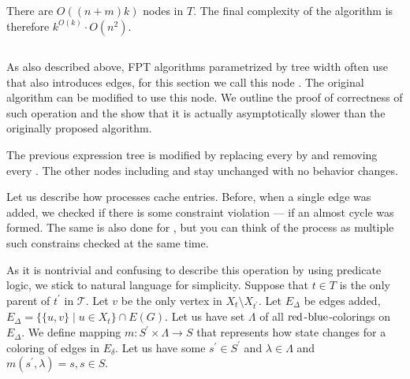 There are \( O((n+m)k) \) nodes in \( T \).
The final complexity of the algorithm is therefore
\( {k}^{O(k)} \cdot O(n^2) \).

\subsection{\IntroduceVertexWithEdgesNode{}}

As also described above, FPT algorithms parametrized by tree width
often use \IntroduceVertexNode{} that also introduces edges,
for this section we call this node \IntroduceVertexWithEdgesNode{}.
The original algorithm can be modified to use this node.
We outline the proof of correctness of such operation and the show
that it is actually asymptotically slower than the originally proposed algorithm.

The previous expression tree is modified by
replacing every \IntroduceVertexNode{} by \IntroduceVertexWithEdgesNode{}
and removing every \IntroduceEdgeNode{}.
The other nodes including \ForgetVertexNode{} and \JoinNode{} stay unchanged
with no behavior changes.

Let us describe how \IntroduceVertexWithEdgesNode{} processes cache entries.
Before, when a single edge was added,
we checked if there is some constraint violation
--- if an almost cycle was formed.
The same is also done for \IntroduceVertexWithEdgesNode{},
but you can think of the process as
multiple such constrains checked at the same time.

As it is nontrivial and confusing to describe this operation
by using predicate logic, we stick to natural language for simplicity.
Suppose that \( t \in T \) is
the only parent of \( t^\prime\) in \( \mathcal {T} \).
Let \( v \) be the only vertex in \( X_t \setminus X_{t^\prime} \).
Let \( E_\Delta \) be edges added,
\( E_\Delta = \{ \{ u, v \} \mid u \in X_t \} \cap E(G) \).
Let us have set \( \Lambda \) of all \( \text{red} \)-\( \text{blue} \)-colorings on \( E_\Delta \).
We define mapping \( m: S^\prime \times \Lambda \to S \)
that represents how state changes for a coloring of edges in \( E_\delta \).
Let us have some \( s^\prime \in S^\prime \) and \( \lambda \in \Lambda \)
and \( m(s^\prime, \lambda) = s, s \in S \).

